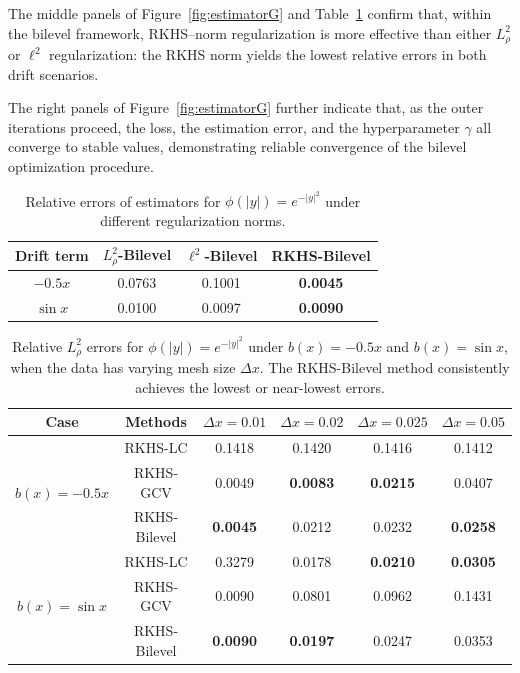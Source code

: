 \documentclass[12pt]{article}
\numberwithin{equation}{section}
\numberwithin{theorem}{section}
\begin{document}
The middle panels of Figure~\ref{fig:estimatorG} and Table~\ref{tab:errorNormG} confirm that, within the bilevel framework, RKHS–norm regularization is more effective than either $L_{\rho}^2$ or $\ell^2$ regularization: the RKHS norm yields the lowest relative errors in both drift scenarios. 


The right panels of Figure~\ref{fig:estimatorG} further indicate that, as the outer iterations proceed, the loss, the estimation error, and the hyperparameter $\gamma$ all converge to stable values, demonstrating reliable convergence of the bilevel optimization procedure.





\begin{table}[H]
    \centering
    \caption{Relative errors of estimators for $\phi(|y|)=e^{-|y|^2}$ under different regularization norms.}
    \begin{tabular}{c|ccc}
        \toprule
         Drift term & $L^2_{\rho}$-Bilevel & $\ell^2$-Bilevel & \textbf{RKHS-Bilevel}\\
        \hline
         $-0.5x$ & 0.0763 &0.1001 & \textbf{0.0045} \\
         
         $\sin x$&0.0100 &0.0097 &\textbf{0.0090} \\
        \bottomrule
    \end{tabular}
    \vspace{0cm}
    \label{tab:errorNormG}
\end{table}


\begin{table}[H]
    \centering
    \caption{Relative $L^2_\rho$ errors for $\phi(|y|)=e^{-|y|^2}$ under  $b(x)=-0.5x$ and $b(x)=\sin x$, when the data has varying mesh size $\Delta x$. The RKHS-Bilevel method consistently achieves the lowest or near-lowest errors.}
    \begin{tabular}{c c|cccc}
        \toprule
        Case & Methods & $\Delta x = 0.01$ & $\Delta x = 0.02$ & $\Delta x = 0.025$ & $\Delta x = 0.05$ \\
        \midrule
        \multirow{3}{*}{$b(x)=-0.5x$} 
            & RKHS-LC      & 0.1418 & 0.1420 & 0.1416 & 0.1412 \\
            & RKHS-GCV     & 0.0049 & \textbf{0.0083} & \textbf{0.0215} & 0.0407 \\
            & RKHS-Bilevel & \textbf{0.0045} & {0.0212} & {0.0232} & \textbf{0.0258} \\
        \midrule
        \multirow{3}{*}{$b(x)=\sin x$} 
            & RKHS-LC      & 0.3279 & 0.0178 & \textbf{0.0210} & \textbf{0.0305} \\
            & RKHS-GCV     & 0.0090 & 0.0801 & 0.0962 & 0.1431 \\
            & {RKHS-Bilevel} & \textbf{0.0090} & \textbf{0.0197} & {0.0247} & {0.0353} \\
        \bottomrule
    \end{tabular}
    \vspace{0cm}
    \label{tab:errorG}
\end{table}
\end{document}
